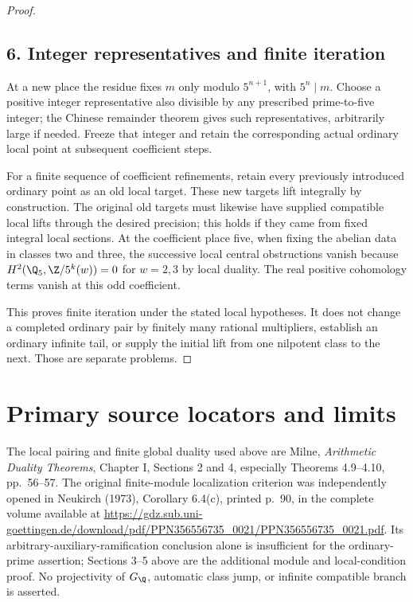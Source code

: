 \begin{proof}
\subsection*{6. Integer representatives and finite iteration}
At a new place the residue fixes $m$ only modulo $5^{n+1}$, with $5^n\mid m$. Choose a positive integer representative also divisible by any prescribed prime-to-five integer; the Chinese remainder theorem gives such representatives, arbitrarily large if needed. Freeze that integer and retain the corresponding actual ordinary local point at subsequent coefficient steps.

For a finite sequence of coefficient refinements, retain every previously introduced ordinary point as an old local target. These new targets lift integrally by construction. The original old targets must likewise have supplied compatible local lifts through the desired precision; this holds if they came from fixed integral local sections. At the coefficient place five, when fixing the abelian data in classes two and three, the successive local central obstructions vanish because $H^2(\Q_5,\Z/5^k(w))=0$ for $w=2,3$ by local duality. The real positive cohomology terms vanish at this odd coefficient.

This proves finite iteration under the stated local hypotheses. It does not change a completed ordinary pair by finitely many rational multipliers, establish an ordinary infinite tail, or supply the initial lift from one nilpotent class to the next. Those are separate problems.
\end{proof}

\section*{Primary source locators and limits}
The local pairing and finite global duality used above are Milne, \emph{Arithmetic Duality Theorems}, Chapter I, Sections 2 and 4, especially Theorems 4.9--4.10, pp.~56--57. The original finite-module localization criterion was independently opened in Neukirch (1973), Corollary 6.4(c), printed p.~90, in the complete volume available at
\url{https://gdz.sub.uni-goettingen.de/download/pdf/PPN356556735_0021/PPN356556735_0021.pdf}.
Its arbitrary-auxiliary-ramification conclusion alone is insufficient for the ordinary-prime assertion; Sections 3--5 above are the additional module and local-condition proof. No projectivity of $G_\Q$, automatic class jump, or infinite compatible branch is asserted.
